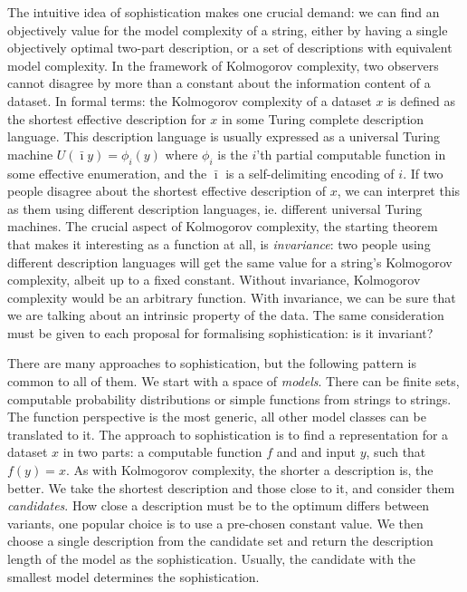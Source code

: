 \documentclass{style/llncs}
\begin{document}

The intuitive idea of sophistication makes one crucial demand: we can find an objectively value for the model complexity of a string, either by having a single objectively optimal two-part description, or a set of descriptions with equivalent model complexity. In the framework of Kolmogorov complexity, two observers cannot disagree by more than a constant about the information content of a dataset. In formal terms: the Kolmogorov complexity of a dataset $x$ is defined as the shortest effective description for $x$ in some Turing complete description language. This description language is usually expressed as a universal Turing machine $U(\bar\imath y) = \phi_i(y)$ where $\phi_i$ is the $i$'th partial computable function in some effective enumeration, and the $\bar\imath$ is a self-delimiting encoding of $i$. If two people disagree about the shortest effective description of $x$, we can interpret this as them using different description languages, ie. different universal Turing machines. The crucial aspect of Kolmogorov complexity, the starting theorem that makes it interesting as a function at all, is \emph{invariance}: two people using different description languages will get the same value for a string's Kolmogorov complexity, albeit up to a fixed constant. Without invariance, Kolmogorov complexity would be an arbitrary function. With invariance, we can be sure that we are talking about an intrinsic property of the data. The same consideration must be given to each proposal for formalising sophistication: is it invariant? 

There are many approaches to sophistication, but the following pattern is common to all of them. We start with a space of \emph{models}. There can be finite sets, computable probability distributions or simple functions from strings to strings. The function perspective is the most generic, all other model classes can be translated to it. The approach to sophistication is to find a representation for a dataset $x$ in two parts: a computable function $f$ and and input $y$, such that $f(y) = x$. As with Kolmogorov complexity, the shorter a description is, the better. We take the shortest description and those close to it, and consider them \emph{candidates}. How close a description must be to the optimum differs between variants, one popular choice is to use a pre-chosen constant value. We then choose a single description from the candidate set and return the description length of the model as the sophistication. Usually, the candidate with the smallest model determines the sophistication.
\end{document}
